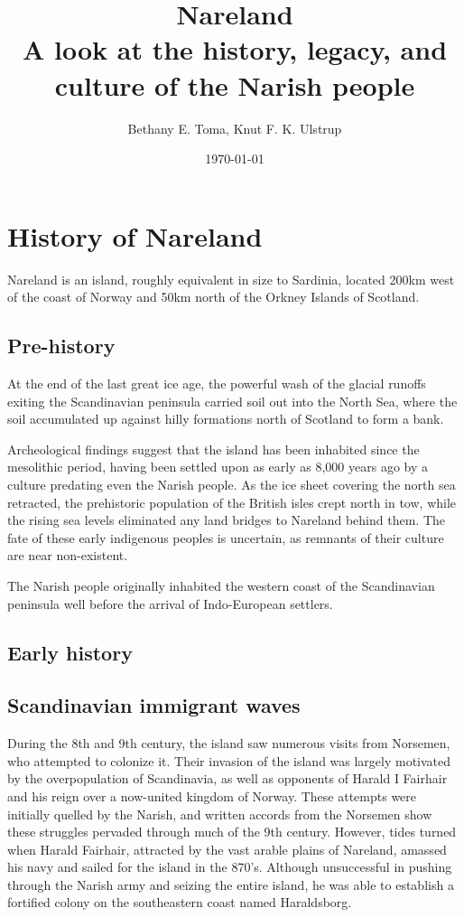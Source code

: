 \documentclass[a4paper,11pt,twoside,openright]{memoir}
\title{{\fontsize{100}{100}\selectfont Nareland} \\ \Huge \sffamily A look at the history, legacy, and culture of the Narish people}
\author{Bethany E. Toma, Knut F. K. Ulstrup}
\date{\today}
\begin{document}
\maketitle

\part{History of Nareland}

Nareland is an island, roughly equivalent in size to Sardinia, located 200km west of the coast of Norway and 50km north of the Orkney Islands of Scotland.

\chapter{Pre-history}

At the end of the last great ice age, the powerful wash of the glacial runoffs exiting the Scandinavian peninsula carried soil out into the North Sea, where the soil accumulated up against hilly formations north of Scotland to form a bank.

Archeological findings suggest that the island has been inhabited since the mesolithic period, having been settled upon as early as 8,000 years ago by a culture predating even the Narish people. As the ice sheet covering the north sea retracted, the prehistoric population of the British isles crept north in tow, while the rising sea levels eliminated any land bridges to Nareland behind them. The fate of these early indigenous peoples is uncertain, as remnants of their culture are near non-existent.

The Narish people originally inhabited the western coast of the Scandinavian peninsula well before the arrival of Indo-European settlers. 

\chapter{Early history}



\chapter{Scandinavian immigrant waves}

During the 8th and 9th century, the island saw numerous visits from Norsemen, who attempted to colonize it. Their invasion of the island was largely motivated by the overpopulation of Scandinavia, as well as opponents of Harald I Fairhair and his reign over a now-united kingdom of Norway. These attempts were initially quelled by the Narish, and written accords from the Norsemen show these struggles pervaded through much of the 9th century. However, tides turned when Harald Fairhair, attracted by the vast arable plains of Nareland, amassed his navy and sailed for the island in the 870's. Although unsuccessful in pushing through the Narish army and seizing the entire island, he was able to establish a fortified colony on the southeastern coast named Haraldsborg.
\end{document}
